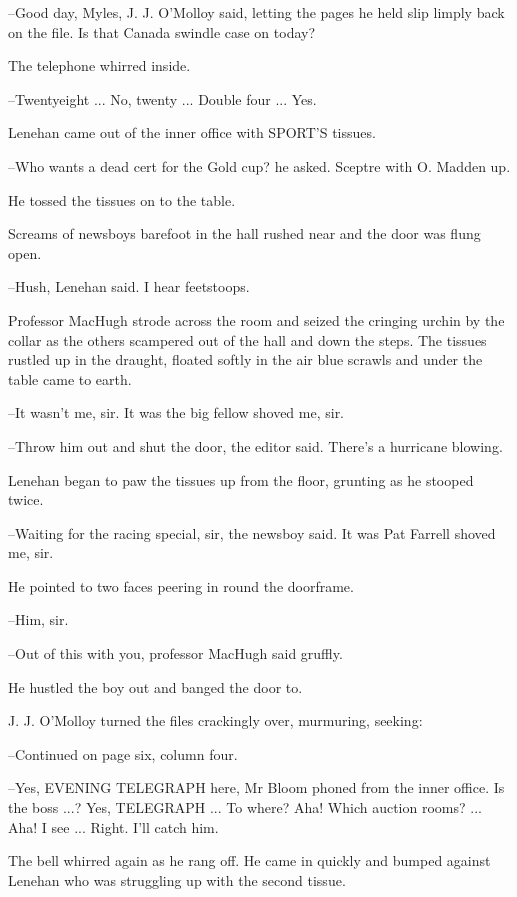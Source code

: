 --Good day, Myles, J. J. O'Molloy said, letting the pages he held slip
limply back on the file. Is that Canada swindle case on today?

The telephone whirred inside.

--Twentyeight ... No, twenty ... Double four ... Yes.



Lenehan came out of the inner office with SPORT'S tissues.

--Who wants a dead cert for the Gold cup? he asked. Sceptre with O.
Madden up.

He tossed the tissues on to the table.

Screams of newsboys barefoot in the hall rushed near and the door
was flung open.

--Hush, Lenehan said. I hear feetstoops.

Professor MacHugh strode across the room and seized the cringing
urchin by the collar as the others scampered out of the hall and down the
steps. The tissues rustled up in the draught, floated softly in the air
blue scrawls and under the table came to earth.

--It wasn't me, sir. It was the big fellow shoved me, sir.

--Throw him out and shut the door, the editor said. There's a hurricane
blowing.

Lenehan began to paw the tissues up from the floor, grunting as he
stooped twice.

--Waiting for the racing special, sir, the newsboy said. It was Pat
Farrell shoved me, sir.

He pointed to two faces peering in round the doorframe.

--Him, sir.

--Out of this with you, professor MacHugh said gruffly.

He hustled the boy out and banged the door to.

J. J. O'Molloy turned the files crackingly over, murmuring, seeking:

--Continued on page six, column four.

--Yes, EVENING TELEGRAPH here, Mr Bloom phoned from the inner office. Is
the boss ...? Yes, TELEGRAPH ... To where? Aha! Which auction rooms? ...
Aha! I see ... Right. I'll catch him.



The bell whirred again as he rang off. He came in quickly and
bumped against Lenehan who was struggling up with the second tissue.

